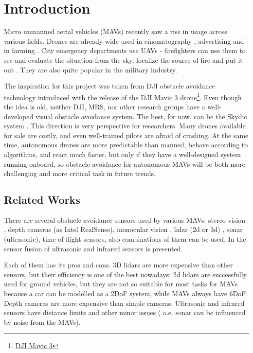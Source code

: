 \chapter{Introduction}

\label{chapter:intro}

Micro unmanned aerial vehicles (MAVs) recently saw a rise in usage across various fields. Drones are already wide used in cinematography \cite{Mademlis2020}, advertising \cite{Ullah2021} and in farming \cite{Kim2019}. 
City emergency departments use UAVs  - firefighters can use them to see and evaluate the situation from the sky, localize the source of fire and put it out \cite{Pritzl2021}. 
They are also quite popular in the military industry.

The inspiration for this project was taken from DJI obstacle avoidance technology introduced with the release of the DJI Mavic 3 drone\footnote{\href{https://www.dji.com/cz/mavic-3}{DJI Mavic 3}}. 
Even though the idea is old, neither DJI, MRS, nor other research groups have a well-developed visual obstacle avoidance system. The best, for now, can be the Skydio system . 
This direction is very perspective for researchers. Many drones available for sale are costly, and even well-trained pilots are afraid of crashing. 
At the same time, autonomous drones are more predictable than manned, behave according to algorithms, and react much faster, but only if they have a well-designed system running onboard, so obstacle avoidance for autonomous MAVs will be both more challenging and more critical task in future trends.

\section{Related Works}
There are several obstacle avoidance sensors used by various MAVs: stereo vision \cite{Ruf2018}, depth cameras (as Intel RealSense), monocular vision \cite{Mejias2010}, lidar (2d or 3d) \cite{Ramasamy2016}, sonar (ultrasonic), time of flight sensors, also combinations of them can be used. 
In \cite{Rambabu2015} the sensor fusion of ultrasonic and infrared sensors is presented.

Each of them has its pros and cons. 
3D lidars are more expensive than other sensors, but their efficiency is one of the best nowadays; 2d lidars are successfully used for ground vehicles, but they are not so suitable for most tasks for MAVs because a car can be modelled as a 2DoF system, while MAVs always have 6DoF. 
Depth cameras are more expensive than simple cameras. Ultrasonic and infrared sensors have distance limits and other minor issues ( a.e. sonar can be influenced by noise from the MAVs). 

